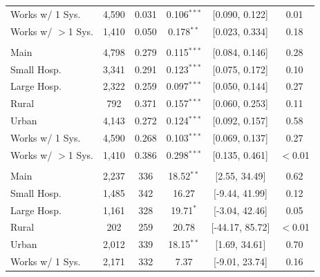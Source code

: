 \begin{table}[!h]
\begin{threeparttable}
\begin{tabular}[t]{lccccc}
\hspace{1em}\quad Works w/ 1 Sys. & 4,590 & 0.031 & 0.106$^{***}$ & {}[0.090, 0.122] & 0.01\\
\hspace{1em}\quad Works w/ $>$1 Sys. & 1,410 & 0.050 & 0.178$^{**}$ & {}[0.023, 0.334] & 0.18\\
\addlinespace[0.3em]
\multicolumn{6}{l}{\textbf{Work in Office}}\\
\hspace{1em}\quad Main & 4,798 & 0.279 & 0.115$^{***}$ & {}[0.084, 0.146] & 0.28\\
\hspace{1em}\quad Small Hosp. & 3,341 & 0.291 & 0.123$^{***}$ & {}[0.075, 0.172] & 0.10\\
\hspace{1em}\quad Large Hosp. & 2,322 & 0.259 & 0.097$^{***}$ & {}[0.050, 0.144] & 0.27\\
\hspace{1em}\quad Rural & 792 & 0.371 & 0.157$^{***}$ & {}[0.060, 0.253] & 0.11\\
\hspace{1em}\quad Urban & 4,143 & 0.272 & 0.124$^{***}$ & {}[0.092, 0.157] & 0.58\\
\hspace{1em}\quad Works w/ 1 Sys. & 4,590 & 0.268 & 0.103$^{***}$ & {}[0.069, 0.137] & 0.27\\
\hspace{1em}\quad Works w/ $>$1 Sys. & 1,410 & 0.386 & 0.298$^{***}$ & {}[0.135, 0.461] & $<$0.01\\
\addlinespace[0.3em]
\multicolumn{6}{l}{\textbf{Number Patients}}\\
\hspace{1em}\quad Main & 2,237 & 336 & 18.52$^{**}$ & {}[2.55, 34.49] & 0.62\\
\hspace{1em}\quad Small Hosp. & 1,485 & 342 & 16.27 & {}[-9.44, 41.99] & 0.12\\
\hspace{1em}\quad Large Hosp. & 1,161 & 328 & 19.71$^{*}$ & {}[-3.04, 42.46] & 0.05\\
\hspace{1em}\quad Rural & 202 & 259 & 20.78 & {}[-44.17, 85.72] & $<$0.01\\
\hspace{1em}\quad Urban & 2,012 & 339 & 18.15$^{**}$ & {}[1.69, 34.61] & 0.70\\
\hspace{1em}\quad Works w/ 1 Sys. & 2,171 & 332 & 7.37 & {}[-9.01, 23.74] & 0.16\\

\end{tabular}
\end{threeparttable}
\end{table}

